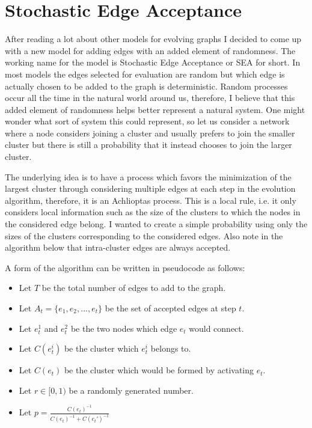 \section{Stochastic Edge Acceptance}
After reading a lot about other models for evolving graphs I decided to come up with a new model for adding edges with an added element of randomness.
The working name for the model is Stochastic Edge Acceptance or SEA for short.
In most models the edges selected for evaluation are random but which edge is actually chosen to be added to the graph is deterministic.
Random processes occur all the time in the natural world around us, therefore, I believe that this added element of randomness helps better represent a natural system.
One might wonder what sort of system this could represent, so let us consider a network where a node considers joining a cluster and usually prefers to join the smaller cluster but there is still a probability that it instead chooses to join the larger cluster.

The underlying idea is to have a process which favors the minimization of the largest cluster through considering multiple edges at each step in the evolution algorithm, therefore, it is an Achlioptas process.
This is a local rule, i.e. it only considers local information such as the size of the clusters to which the nodes in the considered edge belong.
I wanted to create a simple probability using only the sizes of the clusters corresponding to the considered edges.
Also note in the algorithm below that intra-cluster edges are always accepted.

A form of the algorithm can be written in pseudocode as follows:
\begin{itemize}
	\item Let $T$ be the total number of edges to add to the graph.
	\item Let $A_t = \{e_1, e_2, ..., e_t\}$ be the set of accepted edges at step $t$.
	\item Let $e_t^1$ and $e_t^2$ be the two nodes which edge $e_t$ would connect.
	\item Let $C(e_t^i)$ be the cluster which $e_t^i$ belongs to.
	\item Let $C(e_t)$ be the cluster which would be formed by activating $e_t$.
	\item Let $r \in [0, 1)$ be a randomly generated number.
	\item Let $p = \frac{C(e_t)^{-1}}{C(e_t)^{-1} + C(e_t')^{-1}}$
\end{itemize}

